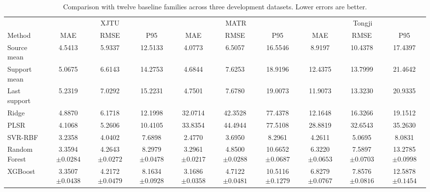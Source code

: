 \begin{table}[!htbp]\centering
\caption{Comparison with twelve baseline families across three development datasets. Lower errors are better.}\label{tab:baselines}
\papertablesize\setlength{\tabcolsep}{2.0pt}\renewcommand{\arraystretch}{1.15}
\begin{tabular}{l*{9}{c}}\toprule
&\multicolumn{3}{c}{XJTU}&\multicolumn{3}{c}{MATR}&\multicolumn{3}{c}{Tongji}\\
\cmidrule(lr){2-4}\cmidrule(lr){5-7}\cmidrule(lr){8-10}
Method & MAE & RMSE & P95 & MAE & RMSE & P95 & MAE & RMSE & P95\\\midrule
Source mean & 4.5413 & 5.9337 & 12.5133  & 4.0773 & 6.5057 & 16.5546  & 8.9197 & 10.4378 & 17.4397  \\
Support mean & 5.0675 & 6.6143 & 14.2753  & 4.6844 & 7.6253 & 18.9196  & 12.4375 & 13.7999 & 21.4642  \\
Last support & 5.2319 & 7.0292 & 15.2231  & 4.7501 & 7.6780 & 19.0073  & 11.9073 & 13.3230 & 20.9335  \\
\midrule
Ridge & 4.8870 & 6.1718 & 12.1998  & 32.0714 & 42.3528 & 77.4378  & 12.1648 & 16.3266 & 19.1512  \\
PLSR & 4.1068 & 5.2606 & 10.4105  & 33.8354 & 44.4944 & 77.5108  & 28.8819 & 32.6543 & 35.2630  \\
SVR-RBF & 3.2358 & 4.0402 & 7.6898  & 2.4770 & 3.6950 & 8.2961  & 4.2611 & 5.0695 & 8.0831  \\
Random Forest & \shortstack{3.3594\\$\pm0.0284$} & \shortstack{4.2643\\$\pm0.0272$} & \shortstack{8.2979\\$\pm0.0478$} & \shortstack{3.2961\\$\pm0.0217$} & \shortstack{4.8500\\$\pm0.0288$} & \shortstack{10.6652\\$\pm0.0687$} & \shortstack{6.3220\\$\pm0.0653$} & \shortstack{7.5897\\$\pm0.0703$} & \shortstack{13.2785\\$\pm0.0998$} \\
XGBoost & \shortstack{3.3507\\$\pm0.0438$} & \shortstack{4.2172\\$\pm0.0479$} & \shortstack{8.1634\\$\pm0.0928$} & \shortstack{3.1686\\$\pm0.0358$} & \shortstack{4.7122\\$\pm0.0481$} & \shortstack{10.5116\\$\pm0.1279$} & \shortstack{6.8279\\$\pm0.0767$} & \shortstack{7.8576\\$\pm0.0816$} & \shortstack{12.5878\\$\pm0.1454$} \\

\end{tabular}
\end{table}
